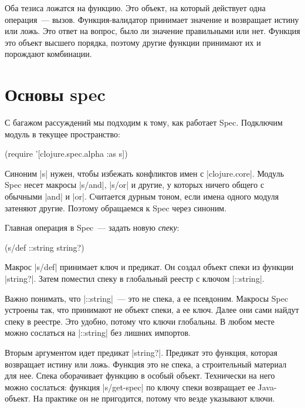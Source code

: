 Оба тезиса ложатся на функцию. Это объект, на который действует одна
операция~--- вызов. Функция-валидатор принимает значение и возвращает истину или
ложь. Это ответ на вопрос, было ли значение правильными или нет. Функция это
объект высшего порядка, поэтому другие функции принимают их и порождают
комбинации.

\section{Основы spec}

С багажом рассуждений мы подходим к тому, как работает Spec. Подключим модуль в
текущее пространство:

\begin{english}
  \begin{clojure}
(require '[clojure.spec.alpha :as s])
  \end{clojure}
\end{english}

Синоним \spverb|s| нужен, чтобы избежать конфликтов имен с
\spverb|clojure.core|. Модуль Spec несет макросы \spverb|s/and|, \spverb|s/or| и
другие, у которых ничего общего с обычными \spverb|and| и \spverb|or|. Считается
дурным тоном, если имена одного модуля затеняют другие. Поэтому обращаемся к
Spec через синоним.

Главная операция в Spec~--- задать новую \emph{спеку}:

\begin{english}
  \begin{clojure}
(s/def ::string string?)
  \end{clojure}
\end{english}

Макрос \spverb|s/def| принимает ключ и предикат. Он создал объект спеки из
функции \spverb|string?|. Затем поместил спеку в глобальный реестр с ключом
\spverb|::string|.

Важно понимать, что \spverb|::string|~--- это не спека, а ее псевдоним. Макросы
Spec устроены так, что принимают не объект спеки, а ее ключ. Далее они сами
найдут спеку в реестре. Это удобно, потому что ключи глобальны. В любом месте
можно сослаться на \spverb|::string| без лишних импортов.

Вторым аргументом идет предикат \spverb|string?|. Предикат это функция, которая
возвращает истину или ложь. Функция это не спека, а строительный материал для
нее. Спека оборачивает функцию в особый объект. Технически на него можно
сослаться: функция \spverb|s/get-spec| по ключу спеки возвращает ее
Java-объект. На практике он не пригодится, потому что везде указывают ключи.

